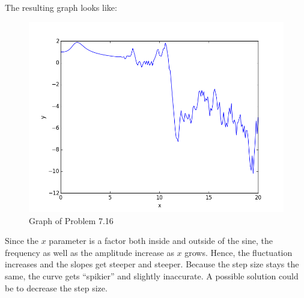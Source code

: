 The resulting graph looks like:

\begin{figure}[!ht]
\includegraphics[width=1\textwidth]{chapters/images/figure-7-16}
\caption{Graph of Problem 7.16}
\end{figure}


Since the $x$ parameter is a factor both inside and outside of the sine, the frequency as well as the amplitude increase as $x$ grows. Hence, the fluctuation increases and the slopes get steeper and steeper. Because the step size stays the same, the curve gets \enquote{spikier} and slightly inaccurate. A possible solution could be to decrease the step size.


